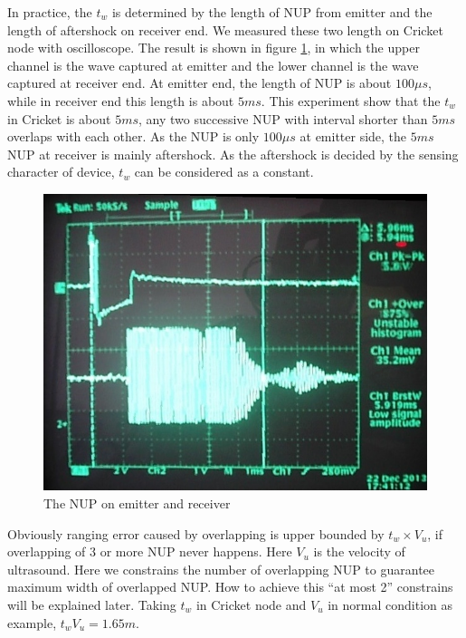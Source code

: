 \documentclass[conference]{IEEEtran}
\begin{document}
In practice, the $t_w$ is determined by the length of NUP from emitter and the length of
aftershock on receiver end. We measured these two length on  Cricket
node\cite{Priyantha:2000hx} with oscilloscope. The result is shown in figure
\ref{fig:OSC}, in which the upper channel is the wave captured at emitter and the lower
channel is the wave captured at receiver end. At emitter end, the length of NUP is about
$100\mu s$, while in receiver end this length is about $5ms$. This experiment show that
the $t_w$ in Cricket is about $5ms$, any two successive NUP with interval
shorter than $5ms$ overlaps with each other. As the NUP is only $100\mu s$ at emitter
side, the $5ms$ NUP at receiver is mainly aftershock. As the aftershock is decided by
the sensing character of device, $t_w$ can be considered as a constant. 
\begin{figure}[htpb]
    \begin{center}
    \includegraphics[width=.3\textwidth]{OSC}
    \caption{The NUP on emitter and receiver}
    \label{fig:OSC}
    \end{center}
\end{figure}
Obviously ranging error caused by overlapping is upper bounded by $t_w \times V_u$, if
overlapping of 3 or more NUP never happens. Here $V_u$ is the velocity of ultrasound.
Here we constrains the number of overlapping NUP to guarantee maximum width of
overlapped NUP. How to achieve this ``at most 2'' constrains will be explained later. 
Taking $t_w$ in Cricket node and $V_u$ in normal condition as example, $t_w V_u=1.65m$.
\end{document}
